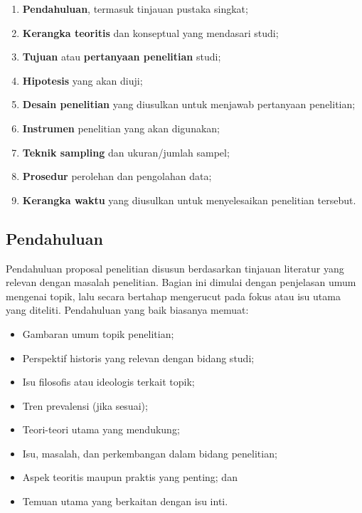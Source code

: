 \documentclass[
  indonesian,
  letterpaper,
  DIV=11,
  numbers=noendperiod]{scrreprt}
\providecommand{\tightlist}{%
  \setlength{\itemsep}{0pt}\setlength{\parskip}{0pt}}
\begin{document}
\begin{enumerate}
\def\labelenumi{\arabic{enumi}.}
\tightlist
\item
  \textbf{Pendahuluan}, termasuk tinjauan pustaka singkat;
\item
  \textbf{Kerangka teoritis} dan konseptual yang mendasari studi;
\item
  \textbf{Tujuan} atau \textbf{pertanyaan penelitian} studi;
\item
  \textbf{Hipotesis} yang akan diuji;
\item
  \textbf{Desain penelitian} yang diusulkan untuk menjawab pertanyaan
  penelitian;
\item
  \textbf{Instrumen} penelitian yang akan digunakan;
\item
  \textbf{Teknik sampling} dan ukuran/jumlah sampel;
\item
  \textbf{Prosedur} perolehan dan pengolahan data;
\item
  \textbf{Kerangka waktu} yang diusulkan untuk menyelesaikan penelitian
  tersebut.
\end{enumerate}

\subsection{Pendahuluan}\label{pendahuluan-2}

Pendahuluan proposal penelitian disusun berdasarkan tinjauan literatur
yang relevan dengan masalah penelitian. Bagian ini dimulai dengan
penjelasan umum mengenai topik, lalu secara bertahap mengerucut pada
fokus atau isu utama yang diteliti. Pendahuluan yang baik biasanya
memuat:

\begin{itemize}
\tightlist
\item
  Gambaran umum topik penelitian;
\item
  Perspektif historis yang relevan dengan bidang studi;
\item
  Isu filosofis atau ideologis terkait topik;
\item
  Tren prevalensi (jika sesuai);
\item
  Teori-teori utama yang mendukung;
\item
  Isu, masalah, dan perkembangan dalam bidang penelitian;
\item
  Aspek teoritis maupun praktis yang penting; dan
\item
  Temuan utama yang berkaitan dengan isu inti.
\end{itemize}
\end{document}
